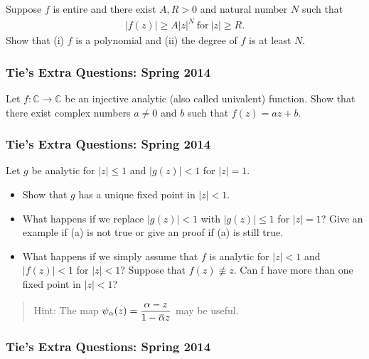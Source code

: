Suppose \(f\) is entire and there exist \(A, R >0\) and natural number
\(N\) such that
\begin{align*}|f(z)| \geq A |z|^N\ \text{for}\ |z| \geq R.\end{align*}
Show that (i) \(f\) is a polynomial and (ii) the degree of \(f\) is at
least \(N\).

\hypertarget{ties-extra-questions-spring-2014-7}{%
\subsubsection{Tie's Extra Questions: Spring
2014}\label{ties-extra-questions-spring-2014-7}}

Let \(f: {\mathbb C} \rightarrow {\mathbb C}\) be an injective analytic
(also called univalent) function. Show that there exist complex numbers
\(a \neq 0\) and \(b\) such that \(f(z) = az + b\).

\hypertarget{ties-extra-questions-spring-2014-8}{%
\subsubsection{Tie's Extra Questions: Spring
2014}\label{ties-extra-questions-spring-2014-8}}

Let \(g\) be analytic for \(|z|\leq 1\) and \(|g(z)| < 1\) for
\(|z| = 1\).

\begin{itemize}
\item
  Show that \(g\) has a unique fixed point in \(|z| < 1\).
\item
  What happens if we replace \(|g(z)| < 1\) with \(|g(z)|\leq 1\) for
  \(|z|=1\)? Give an example if (a) is not true or give an proof if (a)
  is still true.
\item
  What happens if we simply assume that \(f\) is analytic for
  \(|z| < 1\) and \(|f(z)| < 1\) for \(|z| < 1\)? Suppose that
  \(f(z) \not\equiv z\). Can f have more than one fixed point in
  \(|z| < 1\)?
\end{itemize}

\begin{quote}
Hint: The map
\(\displaystyle{\psi_{\alpha}(z)=\frac{\alpha-z}{1-\mkern 1.5mu\overline{\mkern-1.5mu\alpha\mkern-1.5mu}\mkern 1.5muz}}\)
may be useful.
\end{quote}

\hypertarget{ties-extra-questions-spring-2014-9}{%
\subsubsection{Tie's Extra Questions: Spring
2014}\label{ties-extra-questions-spring-2014-9}}

